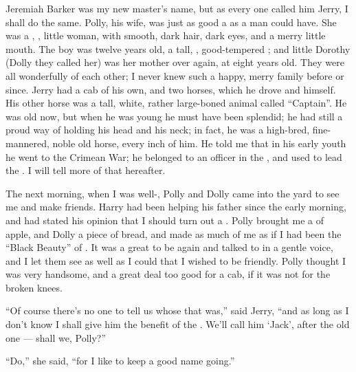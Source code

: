 \documentclass[troisieme]{fiche}
\begin{document}
\begin{texte}
Jeremiah Barker was my new master's name, but as every one called him Jerry, I shall do the
same. Polly, his wife, was just as good a  as a
man could have. She was a , ,
 little woman, with smooth, dark hair, dark eyes, and a merry
little mouth. The boy was twelve years old, a tall, ,
good-tempered ; and little Dorothy (Dolly they called her) was her
mother over again, at eight years old. They were all wonderfully
 of each other; I never knew such a happy, merry family
before or since. Jerry had a cab of his own, and two horses, which he drove and
 himself. His other horse was a tall, white,
rather large-boned animal called ``Captain''. He was old now, but when he was young he must
have been splendid; he had still a proud way of holding his head and
 his neck; in fact, he was a high-bred, fine-mannered, noble old
horse, every inch of him. He told me that in his early youth he went to the Crimean War; he
belonged to an officer in the , and used to lead the
. I will tell more of that hereafter.

The next morning, when I was well-, Polly and Dolly came into
the yard to see me and make friends. Harry had been helping his father since the early
morning, and had stated his opinion that I should turn out a . Polly brought me a  of
apple, and Dolly a piece of bread, and made as much of me as if I had been the ``Black
Beauty'' of . It was a great  to be  again and talked to in a gentle
voice, and I let them see as well as I could that I wished to be friendly. Polly thought I was
very handsome, and a great deal too good for a cab, if it was not for the broken knees.

``Of course there's no one to tell us whose 
that was,'' said Jerry, ``and as long as I don't know I shall give him the benefit of the
. We'll call him `Jack', after the old one --- shall we, Polly?''

``Do,'' she said, ``for I like to keep a good name going.''
\end{texte}
\end{document}
